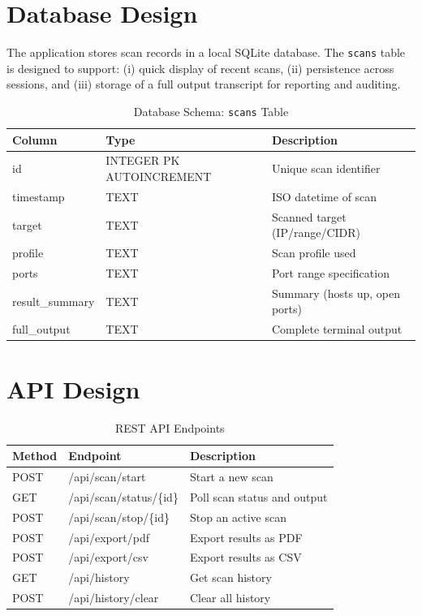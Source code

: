 \documentclass[12pt, a4paper]{report}
\begin{document}
\section{Database Design}
The application stores scan records in a local SQLite database. The \texttt{scans} table is designed to support: (i) quick display of recent scans, (ii) persistence across sessions, and (iii) storage of a full output transcript for reporting and auditing.

\begin{table}[H]
  \centering
  \caption{Database Schema: \texttt{scans} Table}
  \label{tab:db-scans}
  \begin{tabularx}{\textwidth}{@{}l l X@{}}
    \toprule
    \textbf{Column} & \textbf{Type} & \textbf{Description} \\
    \midrule
    id & INTEGER PK AUTOINCREMENT & Unique scan identifier \\
    timestamp & TEXT & ISO datetime of scan \\
    target & TEXT & Scanned target (IP/range/CIDR) \\
    profile & TEXT & Scan profile used \\
    ports & TEXT & Port range specification \\
    result\_summary & TEXT & Summary (hosts up, open ports) \\
    full\_output & TEXT & Complete terminal output \\
    \bottomrule
  \end{tabularx}
\end{table}

\section{API Design}
\begin{table}[H]
  \centering
  \caption{REST API Endpoints}
  \label{tab:api-endpoints}
  \begin{tabularx}{\textwidth}{@{}l l X@{}}
    \toprule
    \textbf{Method} & \textbf{Endpoint} & \textbf{Description} \\
    \midrule
    POST & /api/scan/start & Start a new scan \\
    GET & /api/scan/status/\{id\} & Poll scan status and output \\
    POST & /api/scan/stop/\{id\} & Stop an active scan \\
    POST & /api/export/pdf & Export results as PDF \\
    POST & /api/export/csv & Export results as CSV \\
    GET & /api/history & Get scan history \\
    POST & /api/history/clear & Clear all history \\
    \bottomrule
  \end{tabularx}
\end{table}
\end{document}
